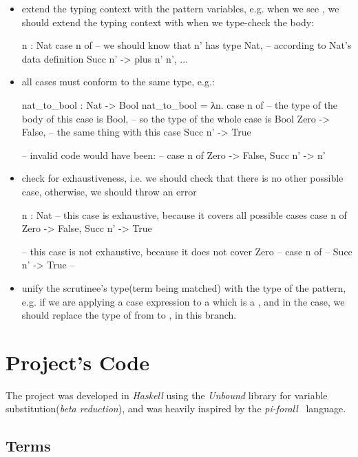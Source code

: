 \begin{itemize}
       \item extend the typing context with the pattern variables, e.g. when we see , we should extend the typing context with  when we type-check the body:
\begin{piforall}
n : Nat
case n of {
  -- we should know that n' has type Nat,
  --  according to Nat's data definition
  Succ n' -> plus n' n',
  ...
}
\end{piforall}
       \item all cases must conform to the same type, e.g.:
\begin{piforall}
nat_to_bool : Nat -> Bool
nat_to_bool = λn. case n of {
  -- the type of the body of this case is Bool,
  -- so the type of the whole case is Bool
  Zero -> False,
  -- the same thing with this case
  Succ n' -> True
}

-- invalid code would have been:
-- case n of { Zero -> False, Succ n' -> n' }
\end{piforall}
       \item check for exhaustiveness, i.e. we should check that there is no other possible case, otherwise, we should throw an error
\begin{piforall}
n : Nat
-- this case is exhaustive, because it covers all possible cases
case n of {
  Zero -> False,
  Succ n' -> True
}

-- this case is not exhaustive, because it does not cover Zero
--   case n of {
--     Succ n' -> True
--   }
\end{piforall}
       \item unify the scrutinee's type(term being matched) with the type of the pattern, e.g. if we are applying a case expression to a  which is a , and in the  case, we should replace the type of  from  to , in this branch.
\end{itemize}



\section{Project's Code}

The project was developed in \emph{Haskell} using the \emph{Unbound} library for variable substitution(\emph{beta reduction}), and was heavily inspired by the \emph{pi-forall}~\cite{oplss} language.
\subsection{Terms}

